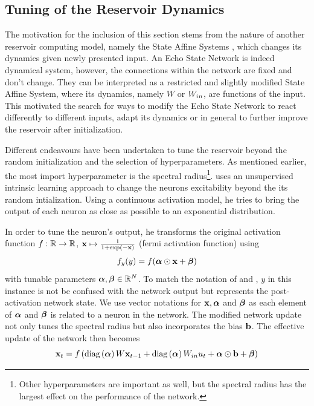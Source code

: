 \subsection{Tuning of the Reservoir Dynamics}
\label{CH:ESN:Tuning}

The motivation for the inclusion of this section stems from the nature of another reservoir computing model, namely the State Affine Systems \citep{Grigortega2018SAS}, which changes its dynamics given newly presented input. An Echo State Network is indeed dynamical system, however, the connections within the network are fixed and don't change. They can be interpreted as a restricted and slightly modified State Affine System, where its dynamics, namely $W$ or $W_{in}$, are functions of the input.
This motivated the search for ways to modify the Echo State Network to react differently to different inputs, adapt its dynamics or in general to further improve the reservoir after initialization.

Different endeavours have been undertaken to tune the reservoir beyond the random initialization and the selection of hyperparameters. As mentioned earlier, the most import hyperparameter is the spectral radius\footnote{Other hyperparameters are important as well, but the spectral radius has the largest effect on the performance of the network.}.
\cite{Triesch2005} uses an unsupervised intrinsic learning approach to change the neurons excitability beyond the its random intialization. Using a continuous activation model, he tries to bring the output of each neuron as close as possible to an exponential distribution. 

In order to tune the neuron's output, he transforms the original activation function $f: \mathbb{R} \to \mathbb{R}$, ${\bf x} \mapsto \frac{1}{1+\text{exp}\left( -{\bf x} \right)}$ (fermi activation function) using
\begin{equation}
    f_{y}(y) = f({{\bm \alpha}}\odot {\bf x} + {{\bm \beta}})
\end{equation}
with tunable parameters ${{\bm \alpha}}, {{\bm \beta}}  \in \mathbb{R}^{N}$. To match the notation of \cite{Triesch2005} and \cite{Schrauwen2008}, $y$ in this instance is not be confused with the network output but represents the post-activation network state. We use vector notations for ${\bf x}, {{\bm \alpha}}$ and ${{\bm \beta}}$ as each element of ${{\bm \alpha}}$ and ${{\bm \beta}}$ is related to a neuron in the network. The modified network update not only tunes the spectral radius but also incorporates the bias ${\bf b}$. The effective update of the network then becomes
\begin{equation}
    {\bf x}_t = f\left(\text{diag}\left({{\bm \alpha}}\right)W{\bf x}_{t-1} + \text{diag}\left({{\bm \alpha}}\right)W_{in} u_t + {{\bm \alpha}} \odot {\bf b} + {{\bm \beta}}\right)
\end{equation}

